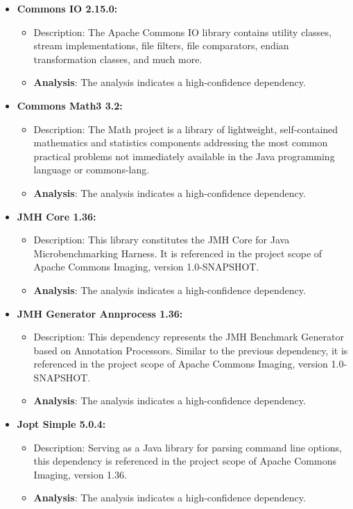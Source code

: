\documentclass[sigconf]{acmart}
\begin{document}
\begin{itemize}
    \item \textbf{Commons IO 2.15.0:}
        \begin{itemize}
            \item Description: The Apache Commons IO library contains utility classes, stream implementations, file filters, file comparators, endian transformation classes, and much more.
            \item \textbf{Analysis}: The analysis indicates a high-confidence dependency.
        \end{itemize}
    
    \item \textbf{Commons Math3 3.2:}
        \begin{itemize}
            \item Description: The Math project is a library of lightweight, self-contained mathematics and statistics components addressing the most common practical problems not immediately available in the Java programming language or commons-lang.
            \item \textbf{Analysis}: The analysis indicates a high-confidence dependency.
        \end{itemize}
    
    \item \textbf{JMH Core 1.36:}
        \begin{itemize}
            \item Description: This library constitutes the JMH Core for Java Microbenchmarking Harness. It is referenced in the project scope of Apache Commons Imaging, version 1.0-SNAPSHOT.
            \item \textbf{Analysis}: The analysis indicates a high-confidence dependency.
        \end{itemize}
    
    \item \textbf{JMH Generator Annprocess 1.36:}
        \begin{itemize}
            \item Description: This dependency represents the JMH Benchmark Generator based on Annotation Processors. Similar to the previous dependency, it is referenced in the project scope of Apache Commons Imaging, version 1.0-SNAPSHOT.
            \item \textbf{Analysis}: The analysis indicates a high-confidence dependency.
        \end{itemize}
    
    \item \textbf{Jopt Simple 5.0.4:}
        \begin{itemize}
            \item Description: Serving as a Java library for parsing command line options, this dependency is referenced in the project scope of Apache Commons Imaging, version 1.36.
            \item \textbf{Analysis}: The analysis indicates a high-confidence dependency.
        \end{itemize}
\end{itemize}
\end{document}
